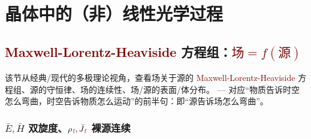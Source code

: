 \chapter{晶体中的（非）线性光学过程}\label{chap:N/LCO}

\vspace*{-8.5em}

\section{\textcolor{Maroon}{Maxwell-Lorentz-Heaviside} 方程组：\textcolor{Maroon}{$\text{场} = f(\text{源})$}}\label{sec:maxwell}

该节从经典/现代的多极理论视角，查看场关于源的 \textcolor{Maroon}{Maxwell-Lorentz-Heaviside} 方程组、源的守恒律、场的连续性、场/源的表面/体分布。 --- 对应“物质告诉时空怎么弯曲，时空告诉物质怎么运动”的前半句：即“源告诉场怎么弯曲”。

\vspace*{-5.0em}

\subsection{$\bar{E},\bar{H}$ 双旋度、${\rho}_{\;\!\textcolor{Maroon}{\text{f}}}, \bar{J}_{\;\!\textcolor{Maroon}{\text{f}}}$ 裸源连续}\label{ssec:EHpJf}

